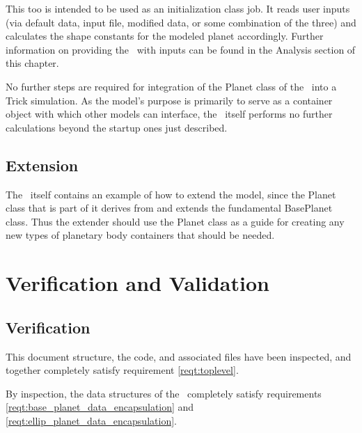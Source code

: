 This too is intended to be used as an initialization class job. It reads user
inputs (via default data, input file, modified data, or some combination of the
three) and calculates the shape constants for the modeled planet accordingly.
Further information on providing the \planetDesc\ with inputs can be found in
the Analysis section of this chapter.

No further steps are required for integration of the Planet class of the
\planetDesc\ into a Trick simulation.  As the model's purpose is primarily to
serve as a container object with which other models can interface, the
\planetDesc\ itself performs no further calculations beyond the startup ones
just described.


\section{Extension}

The \planetDesc\ itself contains an example of how to extend the model, since
the Planet class that is part of it derives from and extends the fundamental
BasePlanet class. Thus the extender should use the Planet class as a guide for
creating any new types of planetary body containers that should be needed.



\chapter{Verification and Validation}\label{ch:ivv}

\section{Verification}

\label{inspect:TLI}
This document structure, the code, and associated files have been inspected,
and together completely satisfy requirement \ref{reqt:toplevel}.

\label{inspect:data_reqts}
By inspection, the data structures of the \planetDesc\ completely satisfy 
requirements \ref{reqt:base_planet_data_encapsulation} and
\ref{reqt:ellip_planet_data_encapsulation}.


